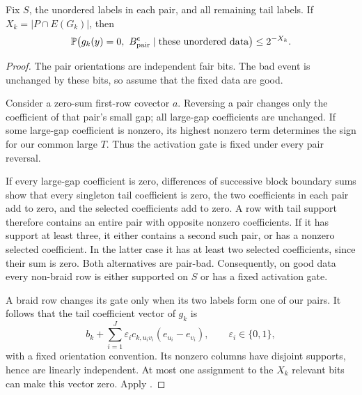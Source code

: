 \begin{lemma}\label{lem:fixed-pair-coins}
Fix $S$, the unordered labels in each pair, and all remaining tail labels.
If $X_k=|P\cap E(G_k)|$, then
\[
 \mathbb P\bigl(g_k(y)=0,\ B_{\rm pair}^{\mathsf c}
       \mid\text{these unordered data}\bigr)\le2^{-X_k}.
\]
\end{lemma}
\begin{proof}
The pair orientations are independent fair bits. The bad event is
unchanged by these bits, so assume that the fixed data are good.

Consider a zero-sum first-row covector $a$. Reversing a pair changes only
the coefficient of that pair's small gap; all large-gap coefficients are
unchanged. If some large-gap coefficient is nonzero, its highest nonzero
term determines the sign for our common large $T$. Thus the activation
gate is fixed under every pair reversal.

If every large-gap coefficient is zero, differences of successive block
boundary sums show that every singleton tail coefficient is zero, the
two coefficients in each pair add to zero, and the selected coefficients
add to zero. A row with tail support therefore contains an entire pair
with opposite nonzero coefficients. If it has support at least three,
it either contains a second such pair, or has a nonzero selected
coefficient. In the latter case it has at least two selected coefficients,
since their sum is zero. Both alternatives are pair-bad. Consequently,
on good data every non-braid row is either supported on $S$ or has a
fixed activation gate.

A braid row changes its gate only when its two labels form one of our
pairs. It follows that the tail coefficient vector of $g_k$ is
\[
 b_k+\sum_{i=1}^J\varepsilon_i c_{k,u_iv_i}(e_{u_i}-e_{v_i}),
 \qquad \varepsilon_i\in\{0,1\},
\]
with a fixed orientation convention. Its nonzero columns have disjoint
supports, hence are linearly independent. At most one assignment to the
$X_k$ relevant bits can make this vector zero. Apply
.
\end{proof}


